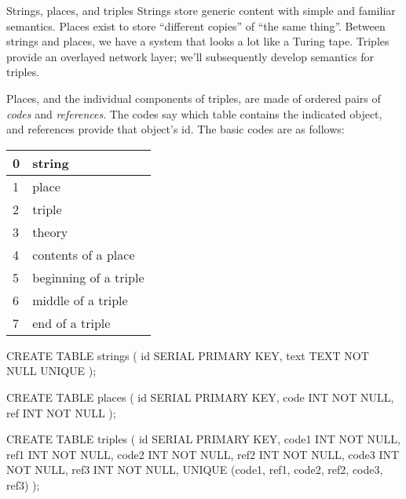 \begin{notate}{Strings, places, and triples} \label{strings-places-and-triples}
Strings store generic content with simple and familiar
semantics.  Places exist to store ``different copies'' of
``the same thing''.  Between strings and places, we have a
system that looks a lot like a Turing tape.  Triples
provide an overlayed network layer; we'll subsequently
develop semantics for triples.

Places, and the individual components of triples, are made
of ordered pairs of \emph{codes} and \emph{references}.
The codes say which table contains the indicated object,
and references provide that object's id.  The basic codes
are as follows:

\begin{center}
\begin{tabular}{|l|l|}
\hline
0 & string \\ \hline
1 & place \\ \hline
2 & triple \\ \hline
3 & theory \\ \hline
4 & contents of a place \\ \hline
5 & beginning of a triple \\ \hline
6 & middle of a triple \\ \hline
7 & end of a triple \\ \hline
\end{tabular}
\end{center}
\end{notate}

\begin{idea}
CREATE TABLE strings (
   id SERIAL PRIMARY KEY,
   text TEXT NOT NULL UNIQUE
);

CREATE TABLE places (
   id SERIAL PRIMARY KEY,
   code INT NOT NULL,
   ref INT NOT NULL
);

CREATE TABLE triples (
   id SERIAL PRIMARY KEY,
   code1 INT NOT NULL,
   ref1 INT NOT NULL,
   code2 INT NOT NULL,
   ref2 INT NOT NULL,
   code3 INT NOT NULL,
   ref3 INT NOT NULL,
   UNIQUE (code1, ref1,
           code2, ref2,
           code3, ref3)
);
\end{idea}

